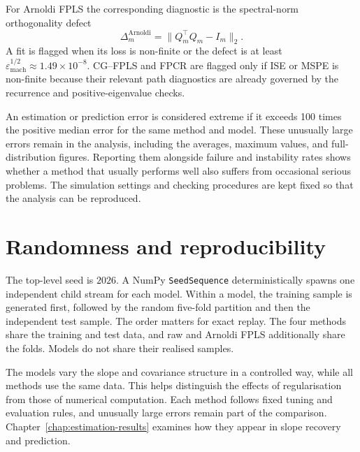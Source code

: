 For Arnoldi FPLS the corresponding diagnostic is the spectral-norm
orthogonality defect
\begin{equation}
    \Delta_m^{\mathrm{Arnoldi}}
    =\|Q_m^\top Q_m-I_m\|_2.
    \label{eq:simulation-arnoldi-defect}
\end{equation}
A fit is flagged when its loss is non-finite or the defect is at least
$\varepsilon_{\mathrm{mach}}^{1/2}\approx1.49\times10^{-8}$.  CG--FPLS and
FPCR are flagged only if ISE or MSPE is non-finite because their relevant path
diagnostics are already governed by the recurrence and positive-eigenvalue
checks.

An estimation or prediction error is considered extreme if it exceeds 100 times the positive median error for the same method and model. These unusually large errors remain in the analysis, including the averages, maximum values, and full-distribution figures. Reporting them alongside failure and instability rates shows whether a method that usually performs well also suffers from occasional serious problems. The simulation settings and checking procedures are kept fixed so that the analysis can be reproduced.

\section{Randomness and reproducibility}
\label{sec:simulation-reproducibility}

The top-level seed is $2026$.  A NumPy \texttt{SeedSequence} deterministically
spawns one independent child stream for each model.  Within a model, the
training sample is generated first, followed by the random five-fold
partition and then the independent test sample.  The order matters for exact
replay.  The four methods share the training and test data, and raw and
Arnoldi FPLS additionally share the folds.  Models do not share their realised
samples.


The models vary the slope and covariance structure in a controlled way, while all methods use the same data. This helps distinguish the effects of regularisation from those of numerical computation. Each method follows fixed tuning and evaluation rules, and unusually large errors remain part of the comparison.
Chapter~\ref{chap:estimation-results} examines how they appear in
slope recovery and prediction.
